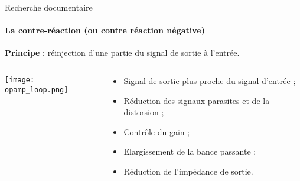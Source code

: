 \documentclass[pdf]{beamer}
\begin{document}
\begin{frame}{Recherche documentaire}
	\framesubtitle{La contre-réaction (ou contre réaction négative)}

	\textbf{Principe} : réinjection d'une partie du signal de sortie à l'entrée.

	\begin{columns}
		\begin{column}{5cm}
			\texttt{[image: opamp\_loop.png]}
		\end{column}

		\begin{column}{5cm}
				\begin{itemize}
					\item Signal de sortie plus proche du signal d'entrée ;
					\item	Réduction des signaux parasites et de la distorsion ;
					\item Contrôle du gain ;
					\item Elargissement de la bance passante ;
					\item Réduction de l'impédance de sortie.
				\end{itemize}
		\end{column}
	\end{columns}
\end{frame}
\end{document}
